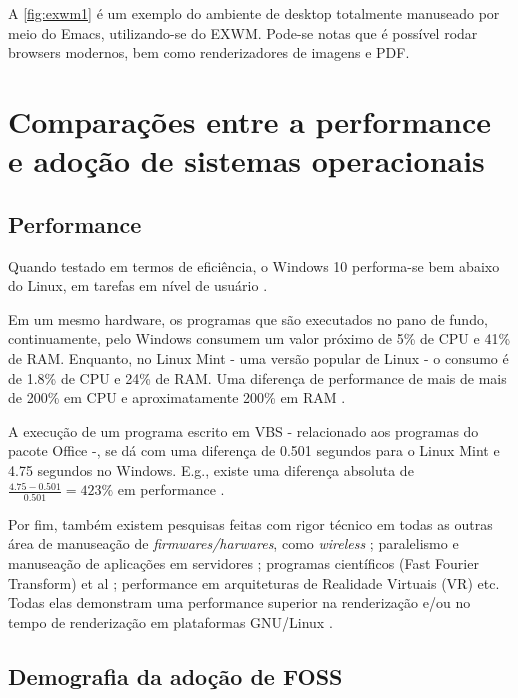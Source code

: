 \documentclass[
12pt,				%
openright,			%
oneside,			%
a4paper,			%
english,			%
french,				%
spanish,			%
brazil,				%
]{abntex2}
\begin{document}
A \autoref{fig:exwm1} é um exemplo do ambiente de desktop totalmente manuseado por meio do Emacs, utilizando-se do EXWM. Pode-se notas que é possível rodar browsers modernos, bem como renderizadores de imagens e PDF.

\section{Comparações entre a performance e adoção de sistemas
  operacionais}

\subsection{Performance}
Quando testado em termos de eficiência, o Windows 10 performa-se bem
abaixo do Linux, em tarefas em nível de usuário \cite{sulaiman2021comparison}.

Em um mesmo hardware, os programas que são
executados no pano de fundo, continuamente, pelo Windows consumem um
valor próximo de 5\%  de CPU e 41\% de RAM. Enquanto, no Linux Mint - uma
versão popular de Linux - o consumo é de 1.8\% de CPU e 24\% de
RAM. Uma diferença de performance de mais de mais de 200\% em CPU e
aproximatamente 200\% em RAM \cite{sulaiman2021comparison}.

A execução de um programa escrito em VBS - relacionado aos programas
do pacote Office -, se dá com uma diferença de 0.501 segundos para o Linux
Mint e 4.75 segundos no Windows. E.g., existe uma diferença absoluta de
$\frac{4.75-0.501}{0.501}=423\%$ em performance \cite{sulaiman2021comparison}.

Por fim, também existem pesquisas feitas com rigor técnico em todas as
outras área de manuseação de \textit{firmwares/harwares}, como
\textit{wireless} \cite{SDevan2013WINDOWS8V}; paralelismo e
manuseação de aplicações em servidores \cite{aveleda2010performance};
programas científicos (Fast Fourier Transform) et al
\cite{d2011performance}; performance em arquiteturas de Realidade Virtuais (VR)
\cite{thubaasini2010efficient} etc. Todas elas demonstram uma
performance superior na renderização e/ou no tempo de renderização em
plataformas GNU/Linux
\cite{aveleda2010performance,thubaasini2010efficient,SDevan2013WINDOWS8V,sulaiman2021comparison,d2011performance}.

\subsection{Demografia da adoção de FOSS}
\end{document}
